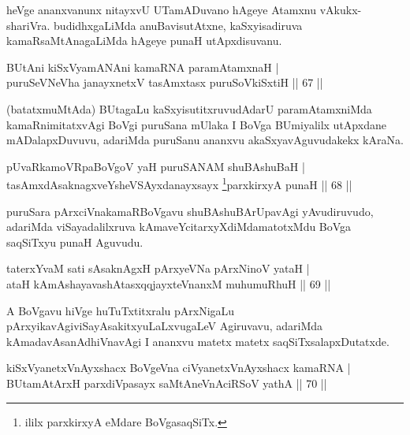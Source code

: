 \begin{artha}
heVge ananxvanunx nitayxvU UTamADuvano hAgeye Atamxnu vAkukx-shariVra. budidhxgaLiMda 
anuBavisutAtxne, kaSxyisadiruva kamaRsaMtAnagaLiMda hAgeye punaH utApxdisuvanu.
\end{artha}


\begin{shl}
BUtAni kiSxVyamANAni kamaRNA paramAtamxnaH |\\
puruSeVNeVha janayxnetxV tasAmxtasx puruSoV\s kiSxtiH \hfill || 67 ||
\end{shl}

\begin{artha}
(batatxmuMtAda) BUtagaLu kaSxyisutitxruvudAdarU paramAtamxniMda kamaRnimitatxvAgi BoVgi puruSana mUlaka I BoVga BUmiyalilx utApxdane mADalapxDuvuvu, adariMda puruSanu ananxvu akaSxyavAguvudakekx kAraNa.
\end{artha}

\begin{shl}
pUvaRkamoVRpaBoVgoV yaH puruSANAM shuBAshuBaH |\\
tasAmxdAsaknagxveYsheVSAyxdanayxsayx \footnote{ililx parxkirxyA eMdare BoVgasaqSiTx.}parxkirxyA punaH \hfill || 68 ||
\end{shl}

\begin{artha}
puruSara pArxciVnakamaRBoVgavu shuBAshuBArUpavAgi yAvudiruvudo, adariMda viSayadalilxruva kAmaveYcitarxyXdiMda\break matotxMdu BoVga saqSiTxyu punaH Aguvudu.
\end{artha}

\begin{shl}
taterxYvaM sati sAsaknAgxH pArxyeVNa pArxNinoV yataH |\\
ataH kAmAshayavashAtasxqqjayxteV\s nanxM muhumuRhuH \hfill || 69 ||
\end{shl}

\begin{artha}
A BoVgavu hiVge huTuTxtitxralu pArxNigaLu pArxyikavAgi\break viSayAsakitxyuLaLxvugaLeV Agiruvavu, adariMda kAmada\break vAsanAdhiVnavAgi I ananxvu matetx matetx saqSiTxsalapxDutatxde.
\end{artha}

\begin{shl}
kiSxVyanetxV\s nAyxshacx BoVgeVna ciVyanetxV\s nAyxshacx kamaRNA |\\
BUtamAtArxH parxdiVpasayx saMtAneVnAciRSoV yathA \hfill || 70 ||
\end{shl}

